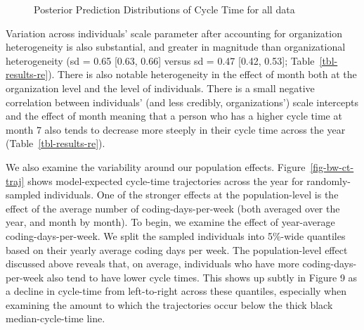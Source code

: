 \documentclass[manuscript,screen,review]{acmart}
\begin{document}
\begin{figure}


\caption[Posterior Prediction Distributions of Cycle Time for all
data]{\label{fig-pp-check-sum}Posterior Prediction Distributions of
Cycle Time for all data}

\end{figure}%

Variation across individuals' scale parameter after accounting for
organization heterogeneity is also substantial, and greater in magnitude
than organizational heterogeneity (sd = 0.65 {[}0.63, 0.66{]} versus sd
= 0.47 {[}0.42, 0.53{]}; Table~\ref{tbl-results-re}). There is also
notable heterogeneity in the effect of month both at the organization
level and the level of individuals. There is a small negative
correlation between individuals' (and less credibly, organizations')
scale intercepts and the effect of month meaning that a person who has a
higher cycle time at month 7 also tends to decrease more steeply in
their cycle time across the year (Table~\ref{tbl-results-re}).

We also examine the variability around our population effects.
Figure~\ref{fig-bw-ct-traj} shows model-expected cycle-time trajectories
across the year for randomly-sampled individuals. One of the stronger
effects at the population-level is the effect of the average number of
coding-days-per-week (both averaged over the year, and month by month).
To begin, we examine the effect of year-average coding-days-per-week. We
split the sampled individuals into 5\%-wide quantiles based on their
yearly average coding days per week. The population-level effect
discussed above reveals that, on average, individuals who have more
coding-days-per-week also tend to have lower cycle times. This shows up
subtly in Figure 9 as a decline in cycle-time from left-to-right across
these quantiles, especially when examining the amount to which the
trajectories occur below the thick black median-cycle-time line.
\end{document}

